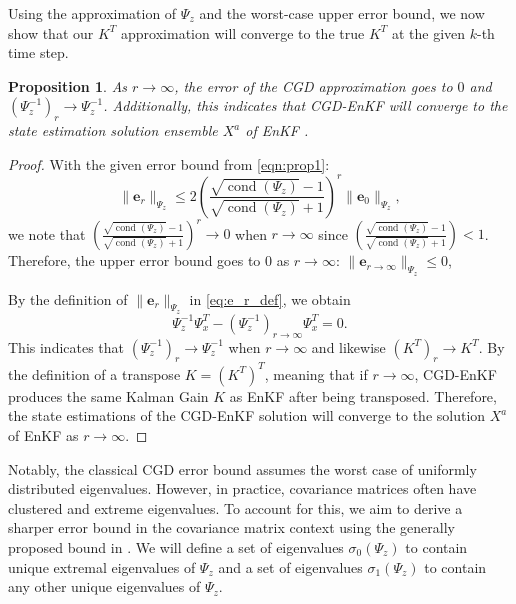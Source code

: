 \documentclass[11p]{elsarticle}
\numberwithin{equation}{section}
\newtheorem{proposition}{Proposition}
\newcommand{\vect}[1]{\ensuremath{\bm{#1}}}
\begin{document}
Using the approximation of $\Psi_{z}$ and the worst-case upper error bound, we now show that our $K^T$ approximation will converge to the true $K^T$ at the given $k$-th time step.


\begin{proposition}
    As $r \rightarrow \infty$, the error of the CGD approximation goes to $0$ and $(\Psi_{z}^{-1})_r \rightarrow \Psi_{z}^{-1}$.  Additionally, this indicates that CGD-EnKF will converge to the state estimation solution ensemble $X^a$ of EnKF .
    \label{prop:2}
\end{proposition}

\begin{proof}
With the given error bound from \eqref{eqn:prop1}:
\begin{equation}
\| \vect{e}_r\|_{\Psi_{z}} \leq 2(\frac{\sqrt{\operatorname{cond}(\Psi_{z})} - 1}{\sqrt{\operatorname{cond}(\Psi_{z})} +1})^r \| \vect{e}_0\|_{\Psi_{z}}, 
\end{equation}
we note that     
$(\frac{\sqrt{\operatorname{cond}(\Psi_{z})} - 1}{\sqrt{\operatorname{cond}(\Psi_{z})} +1})^r \rightarrow 0$ when $r \rightarrow \infty$ since $(\frac{\sqrt{\operatorname{cond}(\Psi_{z})} - 1}{\sqrt{\operatorname{cond}(\Psi_{z})} +1}) < 1$. 
Therefore, the upper error bound goes to $0$ as $r\rightarrow \infty$:
$\| \vect{e}_{r\rightarrow \infty}\|_{\Psi_{z}} \leq 0$, 
    

By the definition of $\| \vect{e}_r\|_{\Psi_{z}}$ in \eqref{eq:e_r_def}, we obtain
\begin{equation}
\Psi_{z}^{-1}\Psi_{x}^T - (\Psi_{z}^{-1})_{r\rightarrow \infty}\Psi_{x}^T = 0.    
\end{equation}
This indicates that $(\Psi_{z}^{-1})_r \rightarrow \Psi_{z}^{-1}$ when $r \rightarrow \infty$ and likewise  $(K^T)_r \rightarrow K^T$.
By the definition of a transpose $K = (K^T)^T$, meaning that if $r\rightarrow \infty$, CGD-EnKF produces the same Kalman Gain $K$ as EnKF after being transposed.  Therefore, the state estimations of the CGD-EnKF solution will converge to the solution $X^a$ of EnKF as $r \rightarrow \infty$.
\end{proof}


Notably, the classical CGD error bound assumes the worst case of uniformly distributed eigenvalues.  However, in practice, covariance matrices often have clustered and extreme eigenvalues.  To account for this, we aim to derive a sharper error bound in the covariance matrix context using the generally proposed bound in \cite{Zhu2008}.  We will define a set of eigenvalues $\sigma_0(\Psi_{z})$ to contain unique extremal eigenvalues of $\Psi_{z}$ and a set of eigenvalues $\sigma_1(\Psi_{z})$ to contain any other unique eigenvalues of $\Psi_{z}$.
\end{document}
